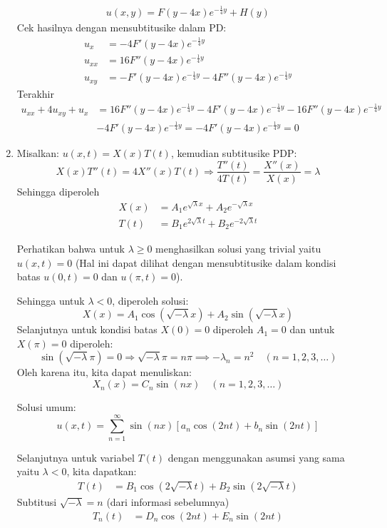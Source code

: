 \documentclass{article}
\theoremstyle{definition}
\begin{document}
\begin{enumerate}
\begin{align*}
u(x,y) = F(y - 4x) e^{-\frac{1}{4} y} + H(y)
\end{align*}
Cek hasilnya dengan mensubtitusike dalam PD:
\begin{align*}
  u_x &= -4F'(y - 4x)e^{-\frac{1}{4}y}\\
  u_{xx} &= 16F''(y - 4x)e^{-\frac{1}{4}y}\\
  u_{xy} &= -F'(y - 4x)e^{-\frac{1}{4}y} - 4F''(y - 4x)e^{-\frac{1}{4}y} 
\end{align*}
Terakhir
\begin{align*}
  u_{xx} + 4u_{xy} + u_x &= 16F''(y - 4x)e^{-\frac{1}{4}y} - 4F'(y - 4x)e^{-\frac{1}{4}y} - 16F''(y - 4x)e^{-\frac{1}{4}y} \\
  &- 4F'(y - 4x)e^{-\frac{1}{4}y} = -4F'(y - 4x)e^{-\frac{1}{4}y} = 0
\end{align*}

\item Misalkan:
$
u(x,t) = X(x)T(t)
$, kemudian subtitusike PDP:
\[
X(x) T''(t) = 4 X''(x) T(t)
\Rightarrow \frac{T''(t)}{4 T(t)} = \frac{X''(x)}{X(x)} = \lambda
\]
Sehingga diperoleh
\[
\begin{aligned}
X(x) &= A_1 e^{\sqrt{\lambda} x} + A_2 e^{-\sqrt{\lambda} x} \\
T(t) &= B_1 e^{2\sqrt{\lambda} t} + B_2 e^{-2\sqrt{\lambda} t}
\end{aligned}
\]

Perhatikan bahwa untuk $\lambda \geq 0$ menghasilkan solusi yang trivial yaitu $u(x,t) = 0$ (Hal ini dapat dilihat dengan mensubtitusike dalam kondisi batas $u(0,t) = 0$ dan $u(\pi,t) = 0$).

Sehingga untuk $\lambda < 0$, diperoleh solusi:
\[
X(x) = A_1\cos(\sqrt{-\lambda} x) + A_2\sin(\sqrt{-\lambda} x)
\]
Selanjutnya untuk kondisi batas $X(0) = 0$ diperoleh $A_1 = 0$ dan untuk $X(\pi) = 0$ diperoleh:
\[
\sin(\sqrt{-\lambda} \pi) = 0 \Rightarrow \sqrt{-\lambda}\pi = n\pi \implies -\lambda_n = n^2 \quad (n = 1, 2, 3, \ldots)
\]
Oleh karena itu, kita dapat menuliskan:
\[
X_n(x) = C_n \sin(n x) \quad (n = 1, 2, 3, \ldots)
\]

Solusi umum:
\[
u(x,t) = \sum_{n=1}^\infty \sin(n x) \left[ a_n \cos(2n t) + b_n \sin(2n t) \right]
\]

Selanjutnya untuk variabel $T(t)$ dengan menggunakan asumsi yang sama yaitu $\lambda<0$, kita dapatkan:
\begin{align*}
  T(t) &= B_1 \cos(2\sqrt{-\lambda} t) + B_2 \sin(2\sqrt{-\lambda} t) 
\end{align*}
Subtitusi $\sqrt{-\lambda} = n$ (dari informasi sebelumnya)
\begin{align*}
  T_n(t) &= D_n \cos(2n t) + E_n \sin(2n t)
\end{align*}


\end{enumerate}
\end{document}
